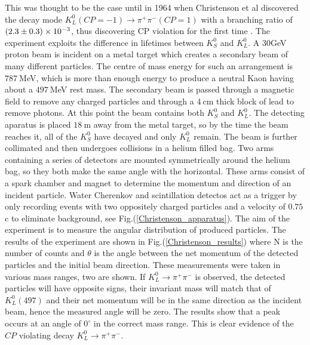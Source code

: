 This was thought to be the case until in 1964 when Christenson et al discovered the decay mode $K^{0}_{L}(CP = -1) \rightarrow \pi^+ \pi^- (CP = 1)$ with a branching ratio of $(2.3 \pm 0.3) \times 10^{-3}$, thus discovering CP violation for the first time \cite{FirstCPV}. The experiment exploits the difference in lifetimes between $K^{0}_{S}$ and $K^{0}_{L}$. A 30GeV proton beam is incident on a metal target which creates a secondary beam of many different particles. The centre of mass energy for such an arrangement is $787~$MeV, which is more than enough energy to produce a neutral Kaon having about a $497~$MeV rest mass. The secondary beam is passed through a magnetic field to remove any charged particles and through a $4~$cm thick block of lead to remove photons. At this point the beam contains both $K^{0}_{S}$ and $K^{0}_{L}$. The detecting aparatus is placed $18~$m away from the metal target, so by the time the beam reaches it, all of the $K^{0}_{S}$ have decayed and only $K^{0}_{L}$ remain. The beam is further collimated and then undergoes collisions in a helium filled bag. Two arms containing a series of detectors are mounted symmetrically around the helium bag, so they both make the same angle with the horizontal. These arms consist of a spark chamber and magnet to determine the momentum and direction of an incident particle. Water Cherenkov and scintillation detectos act as a trigger by only recording events with two oppositely charged particles and a velocity of $0.75~$c to eliminate background, see Fig.(\ref{Christenson_apparatus}). The aim of the experiment is to measure the angular distribution of produced particles. The results of the experiment are shown in Fig.(\ref{Christenson_results}) where N is the number of counts and $\theta$ is the angle between the net momentum of the detected particles and the initial beam direction. These measurements were taken in various mass ranges, two are shown. If $K^{0}_{L} \rightarrow \pi^+ \pi^-$ is observed, the detected particles will have opposite signs, their invariant mass will match that of $K^{0}_{L}(497)$ and their net momentum will be in the same direction as the incident beam, hence the measured angle will be zero. The results show that a peak occurs at an angle of $0^{\circ}$ in the correct mass range. This is clear evidence of the $CP$ violating decay $K^{0}_{L} \rightarrow \pi^+ \pi^-$.   

